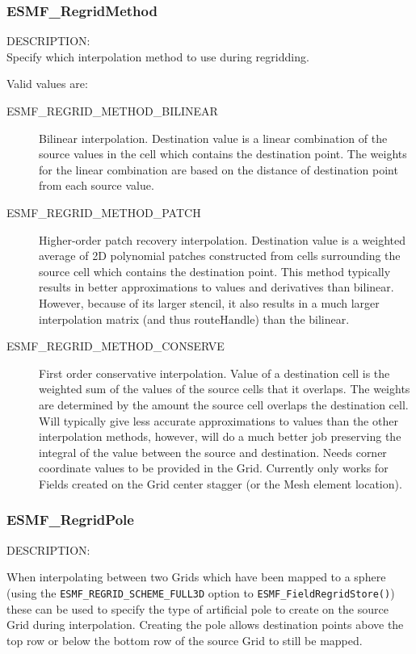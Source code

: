 


\subsubsection{ESMF\_RegridMethod}
\label{opt:regridmethod}
{\sf DESCRIPTION:\\}  
Specify which interpolation method to use during regridding. 

Valid values are:
\begin{description}
\item [ESMF\_REGRID\_METHOD\_BILINEAR]
      Bilinear interpolation. Destination value is a linear combination of the source values in the cell which contains the destination point. The weights for the linear combination are based on the distance of destination point from each source value. 
\item [ESMF\_REGRID\_METHOD\_PATCH]
      Higher-order patch recovery interpolation. Destination value is a weighted average of 2D polynomial patches constructed from cells surrounding the source cell which contains the destination point. This method typically results in better approximations to values and derivatives than bilinear. However, because of its larger stencil, it also results in a much larger interpolation matrix (and thus routeHandle) than the bilinear. 
\item [ESMF\_REGRID\_METHOD\_CONSERVE]
      First order conservative interpolation. Value of a destination cell is the weighted sum of the values of the source cells that it overlaps. The weights are determined by the amount the source cell overlaps the destination cell. Will typically give less accurate approximations to values than the other interpolation methods, however, will do a much better job preserving the integral of the value between the source and destination.  Needs corner coordinate values to be provided in the Grid. Currently only works for Fields created on the Grid center stagger (or the Mesh element location). 
\end{description}

\subsubsection{ESMF\_RegridPole}
\label{opt:regridpole}
{\sf DESCRIPTION:\\}  
\begin{sloppypar}
When interpolating between two Grids which have been mapped to a sphere (using the {\tt ESMF\_REGRID\_SCHEME\_FULL3D} option to {\tt ESMF\_FieldRegridStore()}) these can be used to specify the type of artificial pole to create on the source Grid during interpolation. Creating the pole allows destination points above the top row or below the bottom row of the source Grid to still be mapped.
\end{sloppypar}

